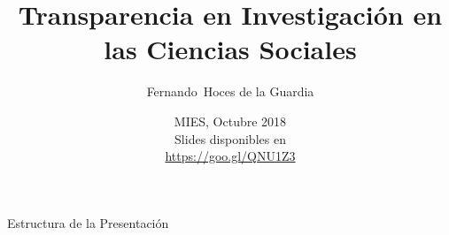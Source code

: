 \documentclass{beamer}
\title[Transparencia en Investigación] %
{Transparencia en Investigación en las Ciencias Sociales}
\subtitle
{}
\author[] %
{Fernando~Hoces de la Guardia\inst{1}}
\institute[Universities of Somewhere and Elsewhere] %
{
  \inst{1}%
  UC Berkeley:\\
  Berkeley Initiative for Transparency in the Social Sciences\\
}
\date[BITSS2018] %
{MIES, Octubre 2018\\
Slides disponibles en \\ \url{https://goo.gl/QNU1Z3}}
\begin{document}
\begin{frame}
  \titlepage
\end{frame}






\begin{frame}{Estructura de la Presentación}
  \tableofcontents
\end{frame}
\end{document}

